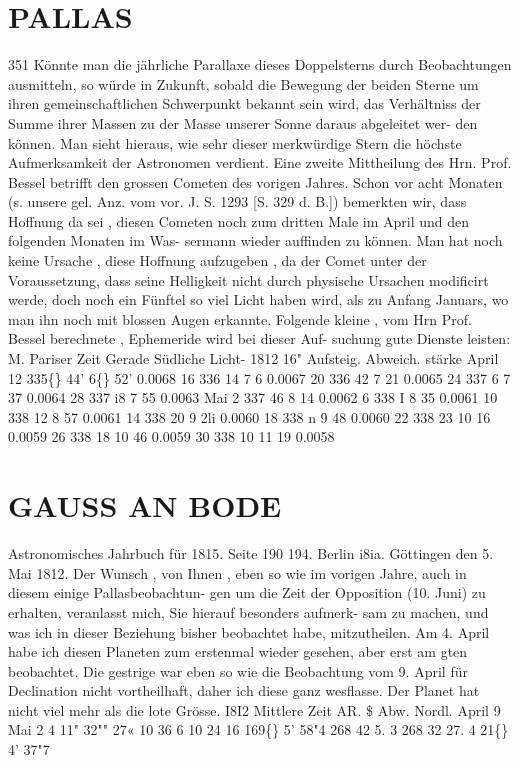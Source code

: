 \documentclass[12pt,a4paper]{article}
\newcommand{\degree}{\textdegree}
\begin{document}
\section*{PALLAS}
351 
Könnte  man  die  jährliche  Parallaxe  dieses  Doppelsterns  durch  Beobachtungen  ausmitteln,  so  würde  in 
Zukunft,  sobald  die  Bewegung  der  beiden  Sterne  um  ihren  gemeinschaftlichen  Schwerpunkt  bekannt 
sein  wird,  das  Verhältniss  der  Summe  ihrer  Massen  zu  der  Masse  unserer  Sonne  daraus  abgeleitet  wer- 
den können.  Man  sieht  hieraus,  wie  sehr  dieser  merkwürdige  Stern  die  höchste  Aufmerksamkeit  der 
Astronomen  verdient. 
Eine  zweite  Mittheilung  des  Hrn.  Prof.  Bessel  betrifft  den  grossen  Cometen  des  vorigen  Jahres. 
Schon  vor  acht  Monaten  (s.  unsere  gel.  Anz.  vom  vor.  J.  S.  1293  [S.  329  d.  B.])  bemerkten  wir,  dass 
Hoffnung  da  sei ,  diesen  Cometen  noch  zum  dritten  Male  im  April  und  den  folgenden  Monaten  im  Was- 
sermann wieder  auffinden  zu  können.  Man  hat  noch  keine  Ursache ,  diese  Hoffnung  aufzugeben ,  da  der 
Comet  unter  der  Voraussetzung,  dass  seine  Helligkeit  nicht  durch  physische  Ursachen  modificirt  werde, 
doch  noch  ein  Fünftel  so  viel  Licht  haben  wird,  als  zu  Anfang  Januars,  wo  man  ihn  noch  mit  blossen 
Augen  erkannte.  Folgende  kleine ,  vom  Hrn  Prof.  Bessel  berechnete ,  Ephemeride  wird  bei  dieser  Auf- 
suchung gute  Dienste  leisten: 
M.  Pariser  Zeit 
Gerade 
Südliche 
Licht- 
1812 16" 
Aufsteig. 
Abweich. 
stärke 
April    12 
335\degree\{\}  44' 
6\degree\{\}  52' 
0.0068 
16 
336     14 
7      6 
0.0067 
20 
336    42 
7    21 
0.0065 
24 
337      6 
7    37 
0.0064 
28 
337    i8 
7    55 
0.0063 
Mai       2 
337    46 
8     14 
0.0062 
6 
338      I 
8    35 
0.0061 
10 
338     12 
8    57 
0.0061 
14 
338    20 
9      2li 
0.0060 
18 
338    n 
9    48 
0.0060 
22 
338    23 
10    16 
0.0059 
26 
338     18 
10    46 
0.0059 
30 
338     10 
11     19 
0.0058 

\section*{GAUSS  AN  BODE}
Astronomisches  Jahrbuch  für  1815.     Seite  190       194.     Berlin  i8ia. 
Göttingen  den  5.  Mai  1812. 
Der  Wunsch ,  von  Ihnen ,  eben  so  wie  im  vorigen  Jahre,  auch  in  diesem  einige  Pallasbeobachtun- 
gen um  die  Zeit  der  Opposition  (10.  Juni)  zu  erhalten,  veranlasst  mich,  Sie  hierauf  besonders  aufmerk- 
sam zu  machen,  und  was  ich  in  dieser  Beziehung  bisher  beobachtet  habe,  mitzutheilen.  Am  4.  April 
habe  ich  diesen  Planeten  zum  erstenmal  wieder  gesehen,  aber  erst  am  gten  beobachtet.  Die  gestrige 
war  eben  so  wie  die  Beobachtung  vom  9.  April  für  Declination  nicht  vortheilhaft,  daher  ich  diese  ganz 
wesflasse.    Der  Planet  hat  nicht  viel  mehr  als  die  lote  Grösse. 
I8I2 
Mittlere  Zeit 
AR.  \$ 
Abw.  Nordl. 
April  9 
Mai      2 
4 
11"  32""  27« 
10     36       6 
10     24     16 
169\degree\{\}     5'    58"4 
268     42      5. 3 
268     32     27. 4 
21\degree\{\}  4'  37"7 
\end{document}
